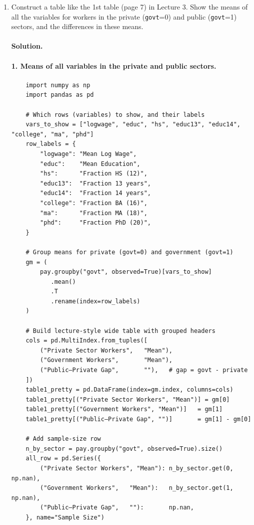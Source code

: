 \documentclass[12pt]{article}
\numberwithin{equation}{section}
\newcommand{\solution}{\paragraph{Solution.}}
\begin{document}
\begin{enumerate}[leftmargin=2em]
  \item Construct a table like the 1st table (page 7) in Lecture 3. Show the means of all the variables for workers in the private (\texttt{govt}=0) and public (\texttt{govt}=1) sectors, and the differences in these means.

    \solution
    \paragraph{1. Means of all variables in the private and public sectors.}
    
    \begin{listing}
    \begin{verbatim}
    import numpy as np
    import pandas as pd
    
    # Which rows (variables) to show, and their labels
    vars_to_show = ["logwage", "educ", "hs", "educ13", "educ14", "college", "ma", "phd"]
    row_labels = {
        "logwage": "Mean Log Wage",
        "educ":    "Mean Education",
        "hs":      "Fraction HS (12)",
        "educ13":  "Fraction 13 years",
        "educ14":  "Fraction 14 years",
        "college": "Fraction BA (16)",
        "ma":      "Fraction MA (18)",
        "phd":     "Fraction PhD (20)",
    }
    
    # Group means for private (govt=0) and government (govt=1)
    gm = (
        pay.groupby("govt", observed=True)[vars_to_show]
           .mean()
           .T
           .rename(index=row_labels)
    )
    
    # Build lecture-style wide table with grouped headers
    cols = pd.MultiIndex.from_tuples([
        ("Private Sector Workers",   "Mean"),
        ("Government Workers",       "Mean"),
        ("Public–Private Gap",       ""),   # gap = govt - private
    ])
    table1_pretty = pd.DataFrame(index=gm.index, columns=cols)
    table1_pretty[("Private Sector Workers", "Mean")] = gm[0]
    table1_pretty[("Government Workers", "Mean")]   = gm[1]
    table1_pretty[("Public–Private Gap", "")]       = gm[1] - gm[0]
    
    # Add sample-size row
    n_by_sector = pay.groupby("govt", observed=True).size()
    all_row = pd.Series({
        ("Private Sector Workers", "Mean"): n_by_sector.get(0, np.nan),
        ("Government Workers",   "Mean"):   n_by_sector.get(1, np.nan),
        ("Public–Private Gap",   ""):       np.nan,
    }, name="Sample Size")
    

\end{verbatim}
\end{listing}
\end{enumerate}
\end{document}
